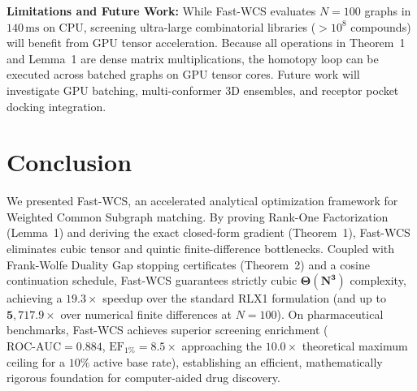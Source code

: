 \documentclass[conference]{IEEEtran}
\begin{document}
\noindent\textbf{Limitations and Future Work:} While Fast-WCS evaluates $N = 100$ graphs in $140\,\text{ms}$ on CPU, screening ultra-large combinatorial libraries ($> 10^8$ compounds) will benefit from GPU tensor acceleration. Because all operations in Theorem~1 and Lemma~1 are dense matrix multiplications, the homotopy loop can be executed across batched graphs on GPU tensor cores. Future work will investigate GPU batching, multi-conformer 3D ensembles, and receptor pocket docking integration.


\section{Conclusion}
\label{sec:conclusion}

We presented Fast-WCS, an accelerated analytical optimization framework for Weighted Common Subgraph matching. By proving Rank-One Factorization (Lemma~1) and deriving the exact closed-form gradient (Theorem~1), Fast-WCS eliminates cubic tensor and quintic finite-difference bottlenecks. Coupled with Frank-Wolfe Duality Gap stopping certificates (Theorem~2) and a cosine continuation schedule, Fast-WCS guarantees strictly cubic $\mathbf{\Theta(N^3)}$ complexity, achieving a $19.3\times$ speedup over the standard RLX1 formulation (and up to $\mathbf{5,717.9\times}$ over numerical finite differences at $N=100$). On pharmaceutical benchmarks, Fast-WCS achieves superior screening enrichment ($\text{ROC-AUC} = 0.884$, $\text{EF}_{1\%} = 8.5\times$ approaching the $10.0\times$ theoretical maximum ceiling for a $10\%$ active base rate), establishing an efficient, mathematically rigorous foundation for computer-aided drug discovery.

\end{document}
